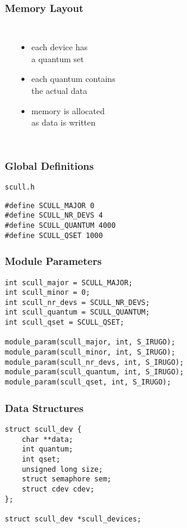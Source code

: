 \documentclass[dvipsnames]{beamer}
\begin{document}
\begin{frame}
  \frametitle{Memory Layout}

  \begin{columns}
    \begin{center}
    \end{center}

    \begin{itemize}
      \item each device has\\
        a quantum set
      \item each quantum contains\\
        the actual data
      \item memory is allocated\\
        as data is written
    \end{itemize}
  \end{columns}
\end{frame}

\begin{frame}[fragile]
  \frametitle{Global Definitions}

  \begin{exampleblock}{\texttt{scull.h}}
    \begin{lstlisting}
#define SCULL_MAJOR 0
#define SCULL_NR_DEVS 4
#define SCULL_QUANTUM 4000
#define SCULL_QSET 1000
    \end{lstlisting}
  \end{exampleblock}
\end{frame}

\begin{frame}[fragile]
  \frametitle{Module Parameters}

  \begin{exampleblock}{}
    \begin{lstlisting}
int scull_major = SCULL_MAJOR;
int scull_minor = 0;
int scull_nr_devs = SCULL_NR_DEVS;
int scull_quantum = SCULL_QUANTUM;
int scull_qset = SCULL_QSET;

module_param(scull_major, int, S_IRUGO);
module_param(scull_minor, int, S_IRUGO);
module_param(scull_nr_devs, int, S_IRUGO);
module_param(scull_quantum, int, S_IRUGO);
module_param(scull_qset, int, S_IRUGO);
    \end{lstlisting}
  \end{exampleblock}
\end{frame}

\begin{frame}[fragile]
  \frametitle{Data Structures}

  \begin{center}
  \end{center}

  \begin{lstlisting}
struct scull_dev {
    char **data;
    int quantum;
    int qset;
    unsigned long size;
    struct semaphore sem;
    struct cdev cdev;
};

struct scull_dev *scull_devices;
  \end{lstlisting}
\end{frame}
\end{document}
